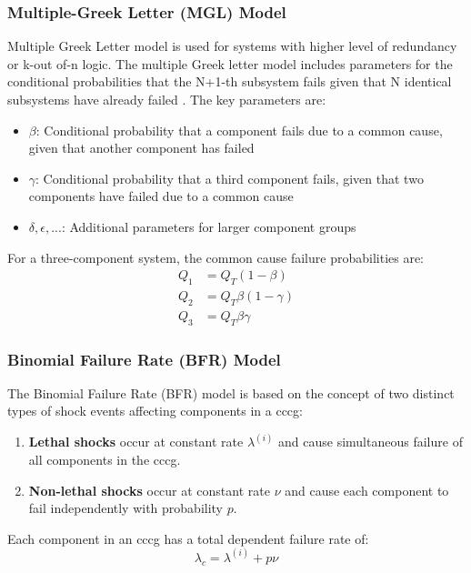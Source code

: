 \subsubsection{Multiple-Greek Letter (MGL) Model}
Multiple Greek Letter model is used for systems with higher level of redundancy or k-out of-n logic. The multiple Greek letter model includes parameters for the conditional probabilities that the N+1-th subsystem fails given that N identical subsystems have already failed \cite{jones_2012}. The key parameters are:
\begin{itemize}
  \item $\beta$: Conditional probability that a component fails due to a common cause, given that another component has failed
  \item $\gamma$: Conditional probability that a third component fails, given that two components have failed due to a common cause
  \item $\delta, \epsilon, ... $: Additional parameters for larger component groups
\end{itemize}

For a three-component system, the common cause failure probabilities are:
\[
\begin{aligned}
Q_1 &= Q_T(1-\beta) \\
Q_2 &= Q_T\beta(1-\gamma) \\
Q_3 &= Q_T\beta\gamma
\end{aligned}
\]

\subsubsection{Binomial Failure Rate (BFR) Model}

The Binomial Failure Rate (BFR) model is based on the concept of two distinct types of shock events affecting components in a \acrshort{cccg}:

\begin{enumerate}
  \item \textbf{Lethal shocks} occur at constant rate $\lambda^{(i)}$ and cause simultaneous failure of all components in the \acrshort{cccg}.
  
  \item \textbf{Non-lethal shocks} occur at constant rate $\nu$ and cause each component to fail independently with probability $p$.
\end{enumerate}

Each component in an \acrshort{cccg} has a total dependent failure rate of:
\begin{equation}
\lambda_c = \lambda^{(i)} + p\nu
\end{equation}


